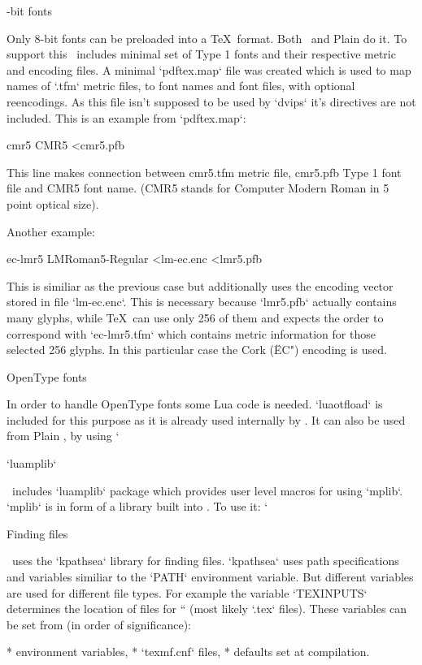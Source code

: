 -bit fonts

Only 8-bit fonts can be preloaded into a \TeX\ format. Both \OpTeX\ and Plain
do it. To support this \MMTeX\ includes minimal set of Type 1 fonts and their
respective metric and encoding files. A minimal `pdftex.map` file was created
which is used to map names of `.tfm` metric files, to font names and font
files, with optional reencodings. As this file isn't supposed to be used by
`dvips` it's directives are not included. This is an example from `pdftex.map`:

\begtt
cmr5 CMR5 <cmr5.pfb
\endtt

This line makes connection between cmr5.tfm metric file, cmr5.pfb Type 1 font
file and CMR5 font name. (CMR5 stands for Computer Modern Roman in 5 point
optical size).

Another example:

\begtt
ec-lmr5 LMRoman5-Regular <lm-ec.enc <lmr5.pfb
\endtt

This is similiar as the previous case but additionally uses the encoding vector
stored in file `lm-ec.enc`. This is necessary because `lmr5.pfb` actually
contains many glyphs, while \TeX\ can use only 256 of them and expects the
order to correspond with `ec-lmr5.tfm` which contains metric information for
those selected 256 glyphs. In this particular case the Cork (\"EC") encoding is
used.

\secc OpenType fonts

In order to handle OpenType fonts some Lua code is needed. `luaotfload` is
included for this purpose as it is already used internally by \OpTeX. It can
also be used from Plain \LuaTeX, by using `

\sec `luamplib`

\MMTeX\ includes `luamplib` package which provides user level macros for using
`mplib`. `mplib` is \Metapost{} in form of a library built into \LuaTeX. To use
it: `

\sec Finding files

\LuaTeX\ uses the `kpathsea` library for finding files. `kpathsea` uses path
specifications and variables similiar to the `PATH` environment variable. But
different variables are used for different file types. For example the variable
`TEXINPUTS` determines the location of files for `` (most likely `.tex`
files). These variables can be set from (in order of significance):

\begitems
* environment variables,
* `texmf.cnf` files,
* defaults set at compilation.
\enditems

